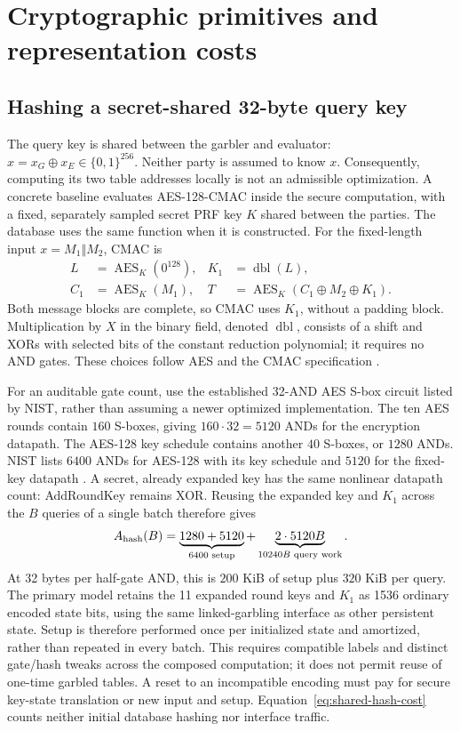 \section{Cryptographic primitives and representation costs}
\label{sec:shuffle-primitives}

\subsection{Hashing a secret-shared 32-byte query key}
The query key is shared between the garbler and evaluator:
$x=x_G\oplus x_E\in\{0,1\}^{256}$.  Neither party is assumed to know $x$.
Consequently, computing its two table addresses locally is not an admissible
optimization.  A concrete baseline evaluates AES-128-CMAC inside the secure
computation, with a fixed, separately sampled secret PRF key $K$ shared between
the parties.  The database uses the same function when it is constructed.
For the fixed-length input $x=M_1\mathbin\Vert M_2$, CMAC is
\begin{align}
 L&=\operatorname{AES}_K(0^{128}), &
 K_1&=\operatorname{dbl}(L),\nonumber\\
 C_1&=\operatorname{AES}_K(M_1), &
 T&=\operatorname{AES}_K(C_1\oplus M_2\oplus K_1).
 \label{eq:shared-cmac}
\end{align}
Both message blocks are complete, so CMAC uses $K_1$, without a padding block.
Multiplication by $X$ in the binary field, denoted $\operatorname{dbl}$, consists
of a shift and XORs with selected bits of the constant reduction polynomial;
it requires no AND gates.  These choices follow AES and the CMAC specification
\cite{aesfips,cmac}.

For an auditable gate count, use the established 32-AND AES S-box circuit listed
by NIST, rather than assuming a newer optimized implementation.  The ten AES
rounds contain $160$ S-boxes, giving $160\cdot32=5120$ ANDs for the encryption
datapath.  The AES-128 key schedule contains another $40$ S-boxes, or $1280$
ANDs.  NIST lists $6400$ ANDs for AES-128 with its key schedule and $5120$ for
the fixed-key datapath \cite{nistcircuits}.  A secret, already expanded key has
the same nonlinear datapath count: AddRoundKey remains XOR.  Reusing the
expanded key and $K_1$ across the $B$ queries of a single batch therefore gives
\begin{equation}
 A_{\rm hash}(B)=
 \underbrace{1280+5120}_{6400\text{ setup}}
 +\underbrace{2\cdot5120B}_{10240B\text{ query work}}.
 \label{eq:shared-hash-cost}
\end{equation}
At 32 bytes per half-gate AND, this is $200$ KiB of setup plus $320$ KiB per
query.  The primary model retains the 11 expanded round keys and $K_1$ as
1536 ordinary encoded state bits, using the same linked-garbling interface
as other persistent state.  Setup is therefore performed once per initialized
state and amortized, rather than repeated in every batch.  This requires
compatible labels and distinct gate/hash tweaks across the composed
computation; it does not permit reuse of one-time garbled tables.  A reset to
an incompatible encoding must pay for secure key-state translation or new
input and setup.  Equation~\eqref{eq:shared-hash-cost} counts neither initial
database hashing nor interface traffic.

